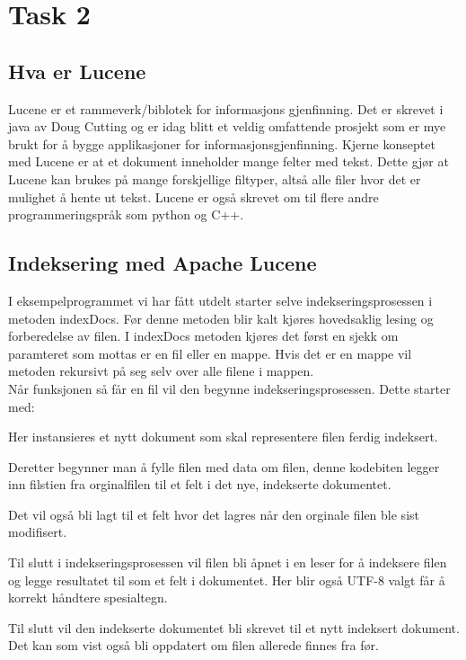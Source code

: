 \lstset{language=C,
numberstyle=\footnotesize,
basicstyle=\ttfamily\footnotesize,
frame=shadowbox,
breaklines=true}


\section*{Task 2}

\subsection*{Hva er Lucene}
Lucene er et rammeverk/biblotek for informasjons gjenfinning. Det er skrevet i java av Doug Cutting og er idag blitt et veldig omfattende prosjekt som er mye brukt for å bygge applikasjoner for informasjonsgjenfinning. Kjerne konseptet med Lucene er at et dokument inneholder mange felter med tekst. Dette gjør at Lucene kan brukes på mange forskjellige filtyper, altså alle filer hvor det er mulighet å hente ut tekst. Lucene er også skrevet om til flere andre programmeringspråk som python og C++.

\subsection*{Indeksering med Apache Lucene}
I eksempelprogrammet vi har fått utdelt starter selve indekseringsprosessen i metoden indexDocs. Før denne metoden blir kalt kjøres hovedsaklig lesing og forberedelse av filen.
I indexDocs metoden kjøres det først en sjekk om paramteret som mottas er en fil eller en mappe. Hvis det er en mappe vil metoden rekursivt på seg selv over alle filene i mappen.\\
Når funksjonen så får en fil vil den begynne indekseringsprosessen. Dette starter med:


Her instansieres et nytt dokument som skal representere filen ferdig indeksert.


Deretter begynner man å fylle filen med data om filen, denne kodebiten legger inn filstien fra orginalfilen til et felt i det nye, indekserte dokumentet. 


Det vil også bli lagt til et felt hvor det lagres når den orginale filen ble sist modifisert.


Til slutt i indekseringsprosessen vil filen bli åpnet i en leser for å indeksere filen og legge resultatet til som et felt i dokumentet. Her blir også UTF-8 valgt får å korrekt håndtere spesialtegn.
\pagebreak

Til slutt vil den indekserte dokumentet bli skrevet til et nytt indeksert dokument. Det kan som vist også bli oppdatert om filen allerede finnes fra før.


